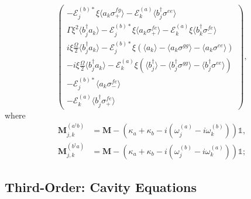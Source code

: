 \documentclass{article}
\begin{document}
\begin{subequations}
\begin{equation}
\begin{pmatrix}
			-\mathcal{E}_{j}^{(b) *} \xi \langle a_{k} \sigma^{fg}_{+} \rangle - \mathcal{E}_{k}^{(a)} \langle b^{\dagger}_{j} \sigma^{ee} \rangle \\
			\Gamma \xi^{2} \langle b^{\dagger}_{j} a_{k} \rangle - \mathcal{E}_{j}^{(b) *} \xi \langle a_{k} \sigma^{fe}_{+} \rangle - \mathcal{E}_{k}^{(a)} \xi \langle b^{\dagger}_{k} \sigma^{fe}_{-} \rangle \\
			i \xi \frac{\Omega}{2} \langle b^{\dagger}_{j} a_{k} \rangle - \mathcal{E}_{j}^{(b) *} \xi \left( \langle a_{k} \rangle - \langle a_{k} \sigma^{gg} \rangle - \langle a_{k} \sigma^{ee} \rangle \right) \\
			-i \xi \frac{\Omega}{2} \langle b^{\dagger}_{j} a_{k} \rangle - \mathcal{E}_{k}^{(a)} \xi \left( \langle b^{\dagger}_{j} \rangle - \langle b^{\dagger}_{j} \sigma^{gg} \rangle - \langle b^{\dagger}_{j} \sigma^{ee} \rangle \right) \\
			-\mathcal{E}_{j}^{(b) *} \langle a_{k} \sigma^{fe}_{-} \rangle \\
			-\mathcal{E}_{k}^{(a)} \langle b^{\dagger}_{j} \sigma^{fe}_{+} \rangle
		\end{pmatrix},
	\end{equation}
\end{subequations}
where
\begin{subequations}
	\begin{align}
		\bm{M}_{j, k}^{(a^{\dagger} b)} &= \bm{M} - \left( \kappa_{a} + \kappa_{b} - i \left( \omega_{j}^{(a)} - i \omega_{k}^{(b)} \right) \right) \mathbb{1}, \\
		\bm{M}_{j, k}^{(b^{\dagger} a)} &= \bm{M} - \left( \kappa_{a} + \kappa_{b} - i \left( \omega_{j}^{(b)} - i \omega_{k}^{(a)} \right) \right) \mathbb{1}; 
	\end{align}
\end{subequations}

\subsection{Third-Order: Cavity Equations}
\end{document}
